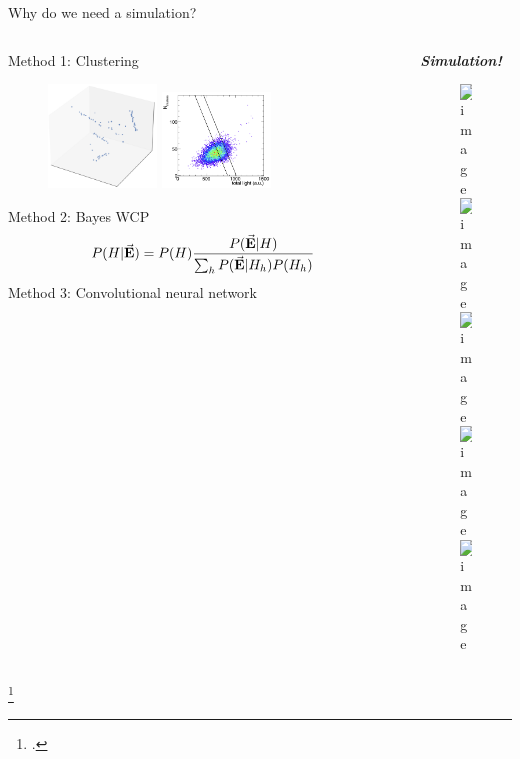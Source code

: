 \documentclass[compress, 13pt, aspectratio=169]{beamer}
\begin{document}
\begin{frame}[t]{Why do we need a simulation?}
    \begin{columns}[t]
        \begin{column}{0.5\textwidth}
            Method 1: Clustering \footnotemark
            \begin{figure}
                \hspace*{-1cm}
                    \centering
                    \includegraphics[width = 0.35\textwidth]{Cluster}
                    \includegraphics[width = 0.35\textwidth]{clusterPlot}
            \end{figure}
            Method 2: Bayes WCP
            $$P(H|\va{E}) = P(H) \frac{P(\va{E}|H)}{\sum_h{P(\va{E}|H_h)P(H_h)}}$$
            Method 3: Convolutional neural network 
        \end{column}
        \begin{column}{0.5\textwidth}
            {\color{red}   {\textbf{\textit{Simulation!}}}}
            \begin{figure}[t]
                \includegraphics<1>[width = \textwidth]{FlowSimu/FlowSimu.001.png}%
                \includegraphics<2>[width = \textwidth]{FlowSimu/FlowSimu.001.png}%
                \includegraphics<3>[width = \textwidth]{FlowSimu/FlowSimu.002.png}%
                \includegraphics<4>[width = \textwidth]{FlowSimu/FlowSimu.003.png}%
                \includegraphics<5>[width = \textwidth]{FlowSimu/FlowSimu.004.png}%
            \end{figure}
        \end{column}
    \end{columns}
    \vspace*{-1.8cm}
    \footcitetext{Neuland::TDR}
\end{frame}
\end{document}
